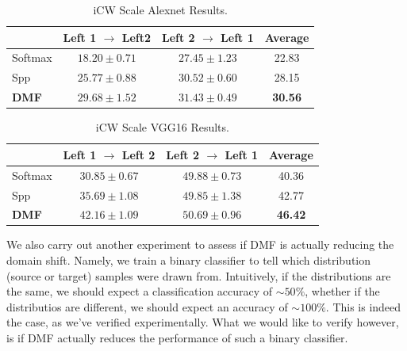 \documentclass[../main.tex]{subfiles}
\begin{document}
    \begin{table}[!ht]
        \centering{}
        \begin{tabular}{l c c c}
            \toprule
                     & Left 1 $\rightarrow$ Left2 & Left 2 $\rightarrow$ Left 1 & Average \\
            \midrule
            Softmax  & $18.20 \pm{} 0.71$ & $27.45 \pm{} 1.23$ & 22.83 \\
            Spp      & $25.77 \pm{} 0.88$ & $30.52 \pm{} 0.60$ & 28.15 \\
        \textbf{DMF} & $\mathbf{29.68 \pm{} 1.52}$ & $\mathbf{31.43 \pm{} 0.49}$ & \textbf{30.56} \\
            \bottomrule
        \end{tabular}
        \caption{iCW Scale Alexnet Results.}
    \end{table}
    
    \begin{table}[!ht]
        \centering{}
        \begin{tabular}{l c c c}
            \toprule
                     & Left 1 $\rightarrow$ Left 2 & Left 2 $\rightarrow$ Left 1 & Average \\
            \midrule
            Softmax  & $30.85 \pm{} 0.67$ & $49.88 \pm{} 0.73$ & 40.36 \\
            Spp      & $35.69 \pm{} 1.08$ & $49.85 \pm{} 1.38$ & 42.77 \\
        \textbf{DMF} & $\mathbf{42.16 \pm{} 1.09}$ & $\mathbf{50.69 \pm{} 0.96}$ & \textbf{46.42} \\
            \bottomrule
        \end{tabular}
        \caption{iCW Scale VGG16 Results.}
    \end{table}

    We also carry out another experiment to assess if DMF is actually reducing the domain shift.
    Namely, we train a binary classifier to tell which distribution (source or target) samples were drawn from.
    Intuitively, if the distributions are the same, we should expect a classification accuracy of $\sim 50\%$,
    whether if the distributios are different, we should expect an accuracy of $\sim 100\%$.
    This is indeed the case, as we've verified experimentally. What we would like to verify however, is if
    DMF actually reduces the performance of such a binary classifier. 
\end{document}

